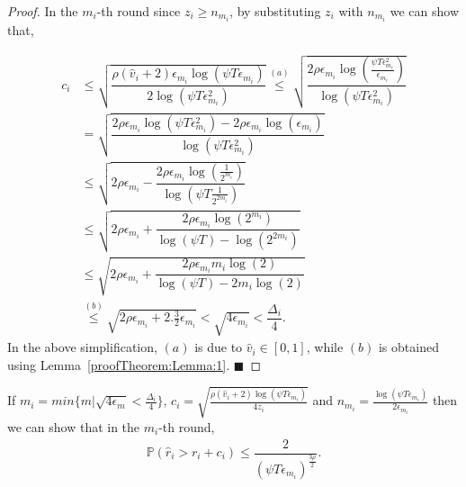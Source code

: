 \begin{proof}

	In the $m_i$-th round since $z_i\geq n_{m_i}$, by substituting $z_i$ with $n_{m_i}$ we can show that, 

\begin{align*}
	c_{i} &\leq \sqrt{\dfrac{\rho (\hat{v}_i + 2)\epsilon_{m_{i}}\log (\psi T\epsilon_{m_{i}})}{2\log(\psi T\epsilon_{m_{i}}^{2})}} \overset{(a)}{\leq} \sqrt{\dfrac{2\rho\epsilon_{m_{i}}\log (\frac{\psi T\epsilon_{m_{i}}^{2}}{\epsilon_{m_{i}}})}{\log(\psi T\epsilon_{m_{i}}^{2})}} \\
	& = \sqrt{\dfrac{2\rho\epsilon_{m_{i}}\log (\psi T\epsilon_{m_{i}}^{2}) - 2\rho\epsilon_{m_{i}}\log (\epsilon_{m_{i}})}{\log(\psi T\epsilon_{m_{i}}^{2})}} \\
	& \leq  \sqrt{2\rho\epsilon_{m_{i}} - \dfrac{2\rho\epsilon_{m_i}\log(\frac{1}{2^{m_i}})}{\log(\psi T \frac{1}{2^{2m_i}})}} \\
	&\leq \sqrt{2\rho\epsilon_{m_{i}} + \dfrac{2\rho\epsilon_{m_i}\log(2^{m_i})}{\log(\psi T) - \log( 2^{2m_i})}}\\
	& \leq \sqrt{2\rho\epsilon_{m_{i}} + \dfrac{2\rho\epsilon_{m_i}m_i \log(2)}{\log(\psi T) - 2m_i\log( 2)}} \\ 
	 & \overset{(b)}{\leq} \sqrt{2\rho\epsilon_{m_{i}} + 2.\frac{3}{2}\epsilon_{m_i}} 
	  < \sqrt{4\epsilon_{m_i}} < \dfrac{\Delta_{i}}{4}.
	\end{align*}
In the above simplification, $(a)$ is due to $\hat{v}_i \in [0,1]$, while $(b)$ is obtained using Lemma~\ref{proofTheorem:Lemma:1}.
\hfill $\blacksquare$	
\end{proof}


\begin{lemma}
\label{proofTheorem:Lemma:3}
If $m_i = min\lbrace m|\sqrt{4\epsilon_{m} } < \frac{\Delta_i}{4} \rbrace $,  $c_{i} = \sqrt{\frac{\rho (\hat{v}_i + 2) \log (\psi T\epsilon_{m_{i}})}{4 z_{i}}}$ and $n_{m_i} = \frac{\log{(\psi T\epsilon_{m_{i}})}}{2\epsilon_{m_{i}}}$ then we can show that in the $m_i$-th round,
\begin{align*}
\mathbb{P}(\hat{r}_{i}> r_{i} + c_{i})\le \dfrac{2}{(\psi  T\epsilon_{m_{i}})^{\frac{3\rho}{2}}}.
\end{align*}
\end{lemma}

